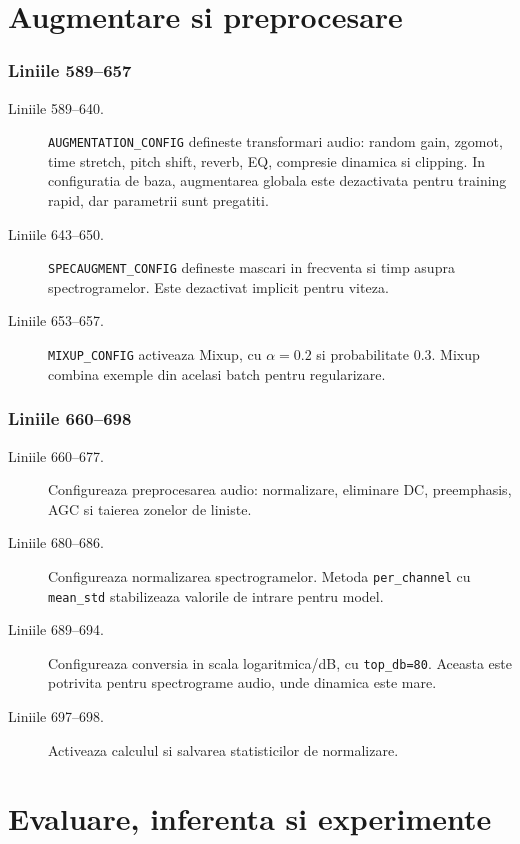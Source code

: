 \documentclass[12pt,a4paper]{report}
\newcommand{\codechunk}[2]{%
\subsection*{Liniile #1--#2}

}
\begin{document}
\chapter{Augmentare si preprocesare}

\codechunk{589}{657}

\begin{description}
    \item[Liniile 589--640.] \texttt{AUGMENTATION\_CONFIG} defineste transformari
    audio: random gain, zgomot, time stretch, pitch shift, reverb, EQ, compresie
    dinamica si clipping. In configuratia de baza, augmentarea globala este
    dezactivata pentru training rapid, dar parametrii sunt pregatiti.

    \item[Liniile 643--650.] \texttt{SPECAUGMENT\_CONFIG} defineste mascari in
    frecventa si timp asupra spectrogramelor. Este dezactivat implicit pentru
    viteza.

    \item[Liniile 653--657.] \texttt{MIXUP\_CONFIG} activeaza Mixup, cu \(\alpha=0.2\)
    si probabilitate 0.3. Mixup combina exemple din acelasi batch pentru
    regularizare.
\end{description}

\codechunk{660}{698}

\begin{description}
    \item[Liniile 660--677.] Configureaza preprocesarea audio: normalizare, eliminare
    DC, preemphasis, AGC si taierea zonelor de liniste.

    \item[Liniile 680--686.] Configureaza normalizarea spectrogramelor. Metoda
    \texttt{per\_channel} cu \texttt{mean\_std} stabilizeaza valorile de intrare
    pentru model.

    \item[Liniile 689--694.] Configureaza conversia in scala logaritmica/dB, cu
    \texttt{top\_db=80}. Aceasta este potrivita pentru spectrograme audio, unde
    dinamica este mare.

    \item[Liniile 697--698.] Activeaza calculul si salvarea statisticilor de
    normalizare.
\end{description}

\chapter{Evaluare, inferenta si experimente}
\end{document}
